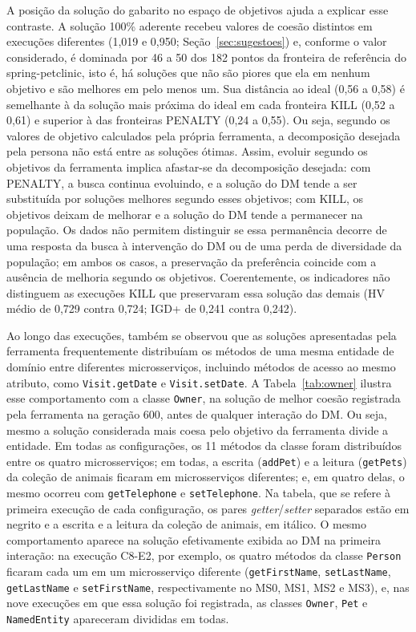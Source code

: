 \documentclass[conference]{IEEEtran}
\begin{document}
A posição da solução do gabarito no espaço de objetivos ajuda a explicar esse contraste. A solução 100\% aderente recebeu valores de coesão distintos em execuções diferentes (1,019 e 0,950; Seção~\ref{sec:sugestoes}) e, conforme o valor considerado, é dominada por 46 a 50 dos 182 pontos da fronteira de referência do spring-petclinic, isto é, há soluções que não são piores que ela em nenhum objetivo e são melhores em pelo menos um. Sua distância ao ideal (0,56 a 0,58) é semelhante à da solução mais próxima do ideal em cada fronteira KILL (0,52 a 0,61) e superior à das fronteiras PENALTY (0,24 a 0,55). Ou seja, segundo os valores de objetivo calculados pela própria ferramenta, a decomposição desejada pela persona não está entre as soluções ótimas. Assim, evoluir segundo os objetivos da ferramenta implica afastar-se da decomposição desejada: com PENALTY, a busca continua evoluindo, e a solução do DM tende a ser substituída por soluções melhores segundo esses objetivos; com KILL, os objetivos deixam de melhorar e a solução do DM tende a permanecer na população. Os dados não permitem distinguir se essa permanência decorre de uma resposta da busca à intervenção do DM ou de uma perda de diversidade da população; em ambos os casos, a preservação da preferência coincide com a ausência de melhoria segundo os objetivos. Coerentemente, os indicadores não distinguem as execuções KILL que preservaram essa solução das demais (HV médio de 0,729 contra 0,724; IGD+ de 0,241 contra 0,242).

Ao longo das execuções, também se observou que as soluções apresentadas pela ferramenta frequentemente distribuíam os métodos de uma mesma entidade de domínio entre diferentes microsserviços, incluindo métodos de acesso ao mesmo atributo, como \texttt{Visit.getDate} e \texttt{Visit.setDate}. A Tabela~\ref{tab:owner} ilustra esse comportamento com a classe \texttt{Owner}, na solução de melhor coesão registrada pela ferramenta na geração 600, antes de qualquer interação do DM. Ou seja, mesmo a solução considerada mais coesa pelo objetivo da ferramenta divide a entidade. Em todas as configurações, os 11 métodos da classe foram distribuídos entre os quatro microsserviços; em todas, a escrita (\texttt{addPet}) e a leitura (\texttt{getPets}) da coleção de animais ficaram em microsserviços diferentes; e, em quatro delas, o mesmo ocorreu com \texttt{getTelephone} e \texttt{setTelephone}. Na tabela, que se refere à primeira execução de cada configuração, os pares \textit{getter}/\textit{setter} separados estão em negrito e a escrita e a leitura da coleção de animais, em itálico. O mesmo comportamento aparece na solução efetivamente exibida ao DM na primeira interação: na execução C8-E2, por exemplo, os quatro métodos da classe \texttt{Person} ficaram cada um em um microsserviço diferente (\texttt{getFirstName}, \texttt{setLastName}, \texttt{getLastName} e \texttt{setFirstName}, respectivamente no MS0, MS1, MS2 e MS3), e, nas nove execuções em que essa solução foi registrada, as classes \texttt{Owner}, \texttt{Pet} e \texttt{NamedEntity} apareceram divididas em todas.
\end{document}
